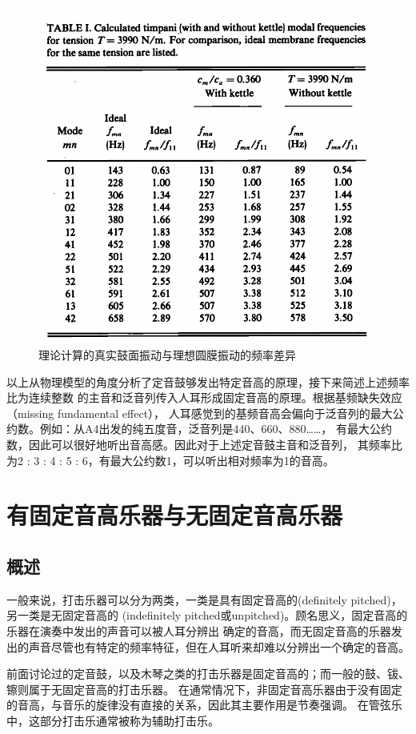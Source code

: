 \documentclass[a4paper]{ctexart}
\begin{document}
	\begin{figure}[htbp]
		\includegraphics[scale=0.4]{calculate_frequency.png}
		\centering
		\caption{理论计算的真实鼓面振动与理想圆膜振动的频率差异\cite{Christian1984Effects}}
		\label{calculate fre}
	\end{figure}
	\par 
	以上从物理模型的角度分析了定音鼓够发出特定音高的原理，接下来简述上述频率比为连续整数
	的主音和泛音列传入人耳形成固定音高的原理。根据基频缺失效应（missing fundamental effect），
	人耳感觉到的基频音高会偏向于泛音列的最大公约数。例如：从A4出发的纯五度音，泛音列是440、660、880……，
	有最大公约数，因此可以很好地听出音高感。因此对于上述定音鼓主音和泛音列，
	其频率比为2 : 3 : 4 : 5 : 6，有最大公约数1，可以听出相对频率为1的音高。
	\section{有固定音高乐器与无固定音高乐器}
	\subsection{概述}
	\par 
	一般来说，打击乐器可以分为两类，一类是具有固定音高的(definitely pitched)，另一类是无固定音高的
	(indefinitely pitched或unpitched)。顾名思义，固定音高的乐器在演奏中发出的声音可以被人耳分辨出
	确定的音高，而无固定音高的乐器发出的声音尽管也有特定的频率特征，但在人耳听来却难以分辨出一个确定的音高。
	\par 
	前面讨论过的定音鼓，以及木琴之类的打击乐器是固定音高的；而一般的鼓、钹、镲则属于无固定音高的打击乐器。
	在通常情况下，非固定音高乐器由于没有固定的音高，与音乐的旋律没有直接的关系，因此其主要作用是节奏强调。
	在管弦乐中，这部分打击乐通常被称为辅助打击乐。
\end{document}
